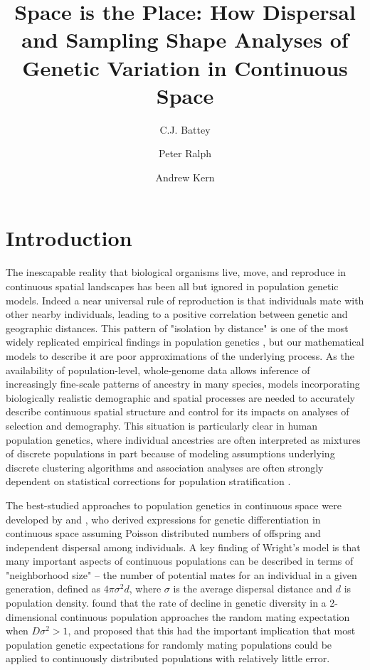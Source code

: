 \documentclass[9pt,twocolumn,twoside,lineno]{gsajnl}
\title{Space is the Place: How Dispersal and Sampling Shape Analyses of Genetic Variation in Continuous Space}
\author[$\ast$,1]{C.J. Battey}
\author[$\ast$]{Peter Ralph}
\author[$\ast$]{Andrew Kern}
\affil[$\ast$]{University of Oregon Dept. Biology, Institute for Ecology Evolution}
\begin{document}
\maketitle
\thispagestyle{firststyle}
\marginmark
\firstpagefootnote


\vspace{-35pt}%

\section{Introduction}
The inescapable reality that biological organisms live, move, and reproduce in continuous spatial landscapes has been all but ignored in population genetic models. Indeed a near universal rule of reproduction is that individuals mate with other nearby individuals, leading to a positive correlation between genetic and geographic distances. This pattern of "isolation by distance" \citep{Wright1943} is one of the most widely replicated empirical findings in population genetics \citep{Chen2017,Jay2012,Sharbel2000}, but our mathematical models to describe it are poor approximations of the underlying process. As the availability of population-level, whole-genome data allows inference of increasingly fine-scale patterns of ancestry in many species, models incorporating biologically realistic demographic and spatial processes are needed to accurately describe continuous spatial structure and control for its impacts on analyses of selection and demography. This situation is particularly clear in human population genetics, where individual ancestries are often interpreted as mixtures of discrete populations in part because of modeling assumptions underlying discrete clustering algorithms and association analyses are often strongly dependent on statistical corrections for population stratification \citep{Berg2018,Bulik-Sullivan2015,Young2018,Heckerman2016,Kang2010,Sohail2018}.  

The best-studied approaches to population genetics in continuous space were developed by \citep{Wright1943} and \citep{Malecot1948}, who derived expressions for genetic differentiation in continuous space assuming Poisson distributed numbers of offspring and independent dispersal among individuals. A key finding of Wright's model is that many important aspects of continuous populations can be described in terms of "neighborhood size" -- the number of potential mates for an individual in a given generation, defined as $4\pi\sigma^2d$, where $\sigma$ is the average dispersal distance and $d$ is population density. \cite{Maruyama1972} found that the rate of decline in genetic diversity in a 2-dimensional continuous population approaches the random mating expectation when $D\sigma^2 > 1$, and proposed that this had the important implication that most population genetic expectations for randomly mating populations could be applied to continuously distributed populations with relatively little error. 
\end{document}
